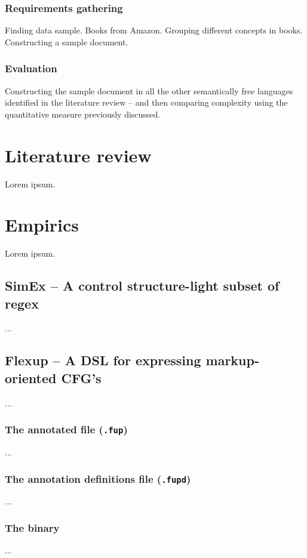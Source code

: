 \documentclass{scrreprt}
\begin{document}
\subsection{Requirements gathering}
Finding data sample. Books from Amazon.
Grouping different concepts in books.
Constructing a sample document.

\subsection{Evaluation}
Constructing the sample document in all the other semantically free languages identified in the literature review -- and then comparing complexity using the quantitative measure previously discussed.






\chapter{Literature review}
Lorem ipsum.






\chapter{Empirics}
Lorem ipsum.


\section{SimEx -- A control structure-light subset of regex}
...


\section{Flexup -- A DSL for expressing markup-oriented CFG's}
...

\subsection{The annotated file (\texttt{.fup})}
...

\subsection{The annotation definitions file (\texttt{.fupd})}
...

\subsection{The binary}
...
\end{document}
